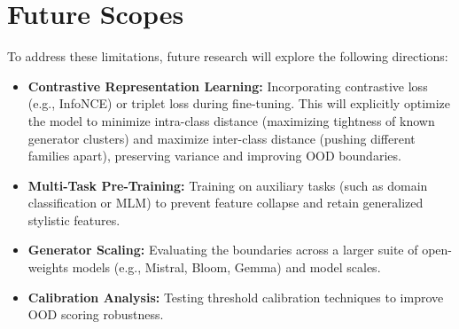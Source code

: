 \section{Future Scopes}\label{Chapter-4-Future}
\noindent To address these limitations, future research will explore the following directions:
\begin{itemize}
    \item \textbf{Contrastive Representation Learning:} Incorporating contrastive loss (e.g., InfoNCE) or triplet loss during fine-tuning. This will explicitly optimize the model to minimize intra-class distance (maximizing tightness of known generator clusters) and maximize inter-class distance (pushing different families apart), preserving variance and improving OOD boundaries.
    \item \textbf{Multi-Task Pre-Training:} Training on auxiliary tasks (such as domain classification or MLM) to prevent feature collapse and retain generalized stylistic features.
    \item \textbf{Generator Scaling:} Evaluating the boundaries across a larger suite of open-weights models (e.g., Mistral, Bloom, Gemma) and model scales.
    \item \textbf{Calibration Analysis:} Testing threshold calibration techniques to improve OOD scoring robustness.
\end{itemize}